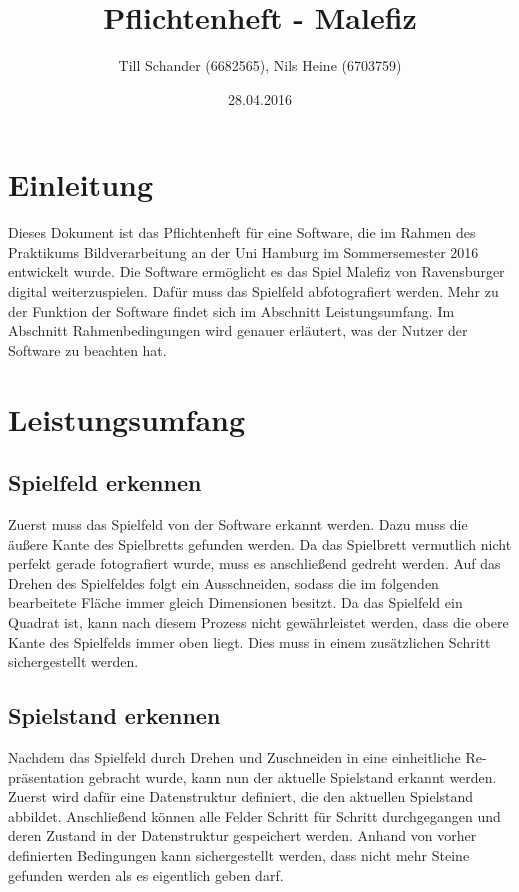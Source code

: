 \documentclass[a4paper]{article}
\title{Pflichtenheft - Malefiz}
\author{Till Schander (6682565), Nils Heine (6703759)}
\date{28.04.2016}
\begin{document}
\maketitle



\section{Einleitung}
Dieses Dokument ist das Pflichtenheft für eine Software, die im Rahmen des Praktikums Bildverarbeitung an der Uni Hamburg im Sommersemester 2016 entwickelt wurde. 
Die Software ermöglicht es das Spiel Malefiz von Ravensburger digital weiterzuspielen. Dafür muss das Spielfeld abfotografiert werden. Mehr zu der Funktion der Software findet sich im Abschnitt Leistungsumfang. Im Abschnitt Rahmenbedingungen wird genauer erläutert, was der Nutzer der Software zu beachten hat.



\section{Leistungsumfang}

\subsection{Spielfeld erkennen}
Zuerst muss das Spielfeld von der Software erkannt werden. Dazu muss die äußere Kante des Spielbretts gefunden werden. Da das Spielbrett vermutlich nicht perfekt gerade fotografiert wurde, muss es anschließend gedreht werden. Auf das Drehen des Spielfeldes folgt ein Ausschneiden, sodass die im folgenden bearbeitete Fläche immer gleich Dimensionen besitzt. Da das Spielfeld ein Quadrat ist, kann nach diesem Prozess nicht gewährleistet werden, dass die obere Kante des Spielfelds immer oben liegt. Dies muss in einem zusätzlichen Schritt sichergestellt werden.

\subsection{Spielstand erkennen}
Nachdem das Spielfeld durch Drehen und Zuschneiden in eine einheitliche Re- präsentation gebracht wurde, kann nun der aktuelle Spielstand erkannt werden. Zuerst wird dafür eine Datenstruktur definiert, die den aktuellen Spielstand abbildet. Anschließend können alle Felder Schritt für Schritt durchgegangen und deren Zustand in der Datenstruktur gespeichert werden. Anhand von vorher definierten Bedingungen kann sichergestellt werden, dass nicht mehr Steine gefunden werden als es eigentlich geben darf.
\end{document}

